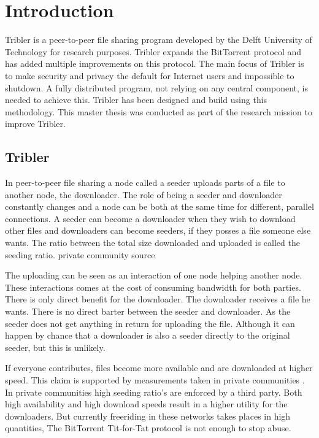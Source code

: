 \chapter{Introduction}
\label{chp:introduction}
Tribler is a peer-to-peer file sharing program developed by the Delft University of Technology for research purposes.
Tribler expands the BitTorrent protocol and has added multiple improvements on this protocol.
The main focus of Tribler is to make security and privacy the default for Internet users and impossible to shutdown.
A fully distributed program, not relying on any central component, is needed to achieve this.
Tribler has been designed and build using this methodology\cite{Pouwelse-tribler}\cite{Bakker-tribler}.
This master thesis was conducted as part of the research mission to improve Tribler.

\vspace{1\baselineskip}

\noindent
{}

\section{Tribler}
In peer-to-peer file sharing a node called a seeder uploads parts
of a file to another node, the downloader.
The role of being a seeder and downloader constantly changes
and a node can be both at the same time for different, parallel connections.
A seeder can become a downloader when they wish to download other files
and downloaders can become seeders,
if they posses a file someone else wants.
The ratio between the total size downloaded and uploaded is called the seeding ratio\cite{Cohen-bittorrent}.
private community source

The uploading can be seen as an interaction of one node helping another node.
These interactions comes at the cost of consuming bandwidth for both parties.
There is only direct benefit for the downloader.
The downloader receives a file he wants.
There is no direct barter between the seeder and downloader.
As the seeder does not get anything in return for uploading the file.
Although it can happen by chance that a downloader is also a seeder directly to the original seeder,
but this is unlikely\cite{Lai-Incentives}.

If everyone contributes, files become more available and are downloaded at higher speed.
This claim is supported by measurements taken in private communities
\cite{meulpolder-privatecommunities}.
In private communities high seeding ratio's are enforced by a third party.
Both high availability and high download speeds result in a higher utility for the downloaders.
But currently freeriding in these networks takes places in high quantities\cite{Adar-Freeriding},
The BitTorrent Tit-for-Tat protocol is not enough to stop abuse\cite{Pouwelse-tribler}.

